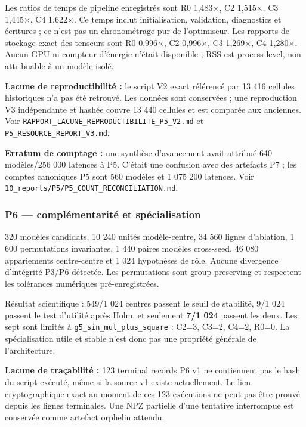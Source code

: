 \documentclass[
]{article}
\begin{document}
Les ratios de temps de pipeline enregistrés sont R0 1,483×, C2 1,515×,
C3 1,445×, C4 1,622×. Ce temps inclut initialisation, validation,
diagnostics et écritures ; ce n'est pas un chronométrage pur de
l'optimiseur. Les rapports de stockage exact des tenseurs sont R0
0,996×, C2 0,996×, C3 1,269×, C4 1,280×. Aucun GPU ni compteur d'énergie
n'était disponible ; RSS est process-level, non attribuable à un modèle
isolé.

\textbf{Lacune de reproductibilité :} le script V2 exact référencé par
13 416 cellules historiques n'a pas été retrouvé. Les données sont
conservées ; une reproduction V3 indépendante et hashée couvre 13 440
cellules et est comparée aux anciennes. Voir
\texttt{RAPPORT\_LACUNE\_REPRODUCTIBILITE\_P5\_V2.md} et
\texttt{P5\_RESOURCE\_REPORT\_V3.md}.

\textbf{Erratum de comptage :} une synthèse d'avancement avait attribué
640 modèles/256 000 latences à P5. C'était une confusion avec des
artefacts P7 ; les comptes canoniques P5 sont 560 modèles et 1 075 200
latences. Voir \texttt{10\_reports/P5/P5\_COUNT\_RECONCILIATION.md}.

\subsubsection{P6 --- complémentarité et
spécialisation}\label{p6-compluxe9mentarituxe9-et-spuxe9cialisation}

320 modèles candidats, 10 240 unités modèle-centre, 34 560 lignes
d'ablation, 1 600 permutations invariantes, 1 440 paires modèles
cross-seed, 46 080 appariements centre-centre et 1 024 hypothèses de
rôle. Aucune divergence d'intégrité P3/P6 détectée. Les permutations
sont group-preserving et respectent les tolérances numériques
pré-enregistrées.

Résultat scientifique : 549/1 024 centres passent le seuil de stabilité,
9/1 024 passent le test d'utilité après Holm, et seulement \textbf{7/1
024} passent les deux. Les sept sont limités à
\texttt{g5\_sin\_mul\_plus\_square} : C2=3, C3=2, C4=2, R0=0. La
spécialisation utile et stable n'est donc pas une propriété générale de
l'architecture.

\textbf{Lacune de traçabilité :} 123 terminal records P6 v1 ne
contiennent pas le hash du script exécuté, même si la source v1 existe
actuellement. Le lien cryptographique exact au moment de ces 123
exécutions ne peut pas être prouvé depuis les lignes terminales. Une NPZ
partielle d'une tentative interrompue est conservée comme artefact
orphelin attendu.
\end{document}
